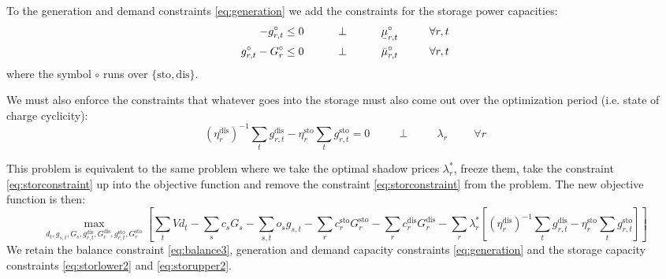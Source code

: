 \documentclass[final,3p,times]{elsarticle}
\newcommand{\ubar}[1]{\text{\b{$#1$}}}
\begin{document}
To the generation and demand constraints \eqref{eq:generation} we add the constraints for the storage power capacities:
\begin{align}
    -g^\circ_{r,t}\leq 0 \hspace{1cm}\perp \hspace{1cm} \ubar{\mu}^\circ_{r,t} \hspace{1cm} \forall r,t  \label{eq:storlower2}\\
    g^\circ_{r,t} - G^\circ_r \leq 0 \hspace{1cm}\perp \hspace{1cm} \bar{\mu}^\circ_{r,t} \hspace{1cm} \forall r,t \label{eq:storupper2}
\end{align}
where the symbol $\circ$ runs over $\{\textrm{sto},\textrm{dis}\}$.

We must also enforce the constraints that whatever goes into the storage must also come out over the optimization period (i.e. state of charge cyclicity):
\begin{equation}
 (\eta_r^{\textrm{dis}})^{-1} \sum_t g^{\textrm{dis}}_{r,t} - \eta_r^{\textrm{sto}}  \sum_t g^{\textrm{sto}}_{r,t}  = 0  \hspace{1cm}\perp \hspace{1cm} \lambda_{r} \hspace{1cm} \forall r \label{eq:storconstraint}
\end{equation}

This problem is equivalent to the same problem where we take the optimal shadow prices $\lambda^*_r$, freeze them, take the constraint \eqref{eq:storconstraint} up into the objective function and remove the constraint \eqref{eq:storconstraint} from the problem. The new objective function is then:
\begin{equation}
    \max_{d_{t}, g_{s,t}, G_s,g^{\textrm{dis}}_{r,t},G^{\textrm{dis}}_{r},g^{\textrm{sto}}_{r,t},G^{\textrm{sto}}_{r}}\left[\sum_{t} Vd_{t} -  \sum_s c_s G_s - \sum_{s,t} o_{s} g_{s,t} -\sum_r c^{\textrm{sto}}_r G^{\textrm{sto}}_r -\sum_r c^{\textrm{dis}}_r G^{\textrm{dis}}_r -\sum_r \lambda^*_r\left[ (\eta_r^{\textrm{dis}})^{-1} \sum_t g^{\textrm{dis}}_{r,t} - \eta_r^{\textrm{sto}}  \sum_t g^{\textrm{sto}}_{r,t}\right]  \right]  \label{eq:objst}
\end{equation}
We retain the balance constraint \eqref{eq:balance3}, generation and demand capacity constraints \eqref{eq:generation} and the storage capacity constraints \eqref{eq:storlower2} and \eqref{eq:storupper2}.
\end{document}
